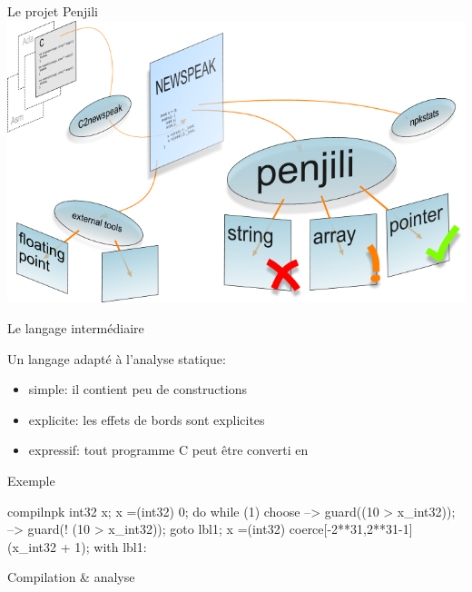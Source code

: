 \section{\newspeak}

\begin{frame}{Le projet Penjili}
\centering
\includegraphics[scale=.5]{img/penjili.png}
\end{frame}

\begin{frame}{Le langage intermédiaire \newspeak}

Un langage adapté à l'analyse statique:

\begin{itemize}
\item simple: il contient peu de constructions
\item explicite: les effets de bords sont explicites
\item expressif: tout programme C peut être converti en \newspeak
\end{itemize}

\end{frame}

\begin{frame}[fragile]{Exemple}

\begin{SaveVerbatim}{compilnpk}
int32 x;
x =(int32) 0;
do {
    while (1) {
        choose {
            -->
                guard((10 > x_int32));
            -->
                guard(! (10 > x_int32));
                goto lbl1;
        }
        x =(int32) coerce[-2**31,2**31-1]
                        (x_int32 + 1);
    }
} with lbl1: {
}
\end{SaveVerbatim}

{\footnotesize
\begin{minipage}{0.3\linewidth}
\end{minipage}
\vrule\hspace{2pt}
\begin{minipage}{0.6\linewidth}
\end{minipage}
}

\end{frame}

\begin{frame}{Compilation \& analyse}



\end{frame}
